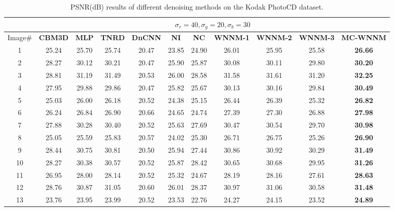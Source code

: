 \begin{table}
\caption{PSNR(dB) results of different denoising methods on the Kodak PhotoCD dataset.}
\begin{adjustwidth}{-1cm}{}
\label{tab4-1}
\begin{center}
\renewcommand\arraystretch{1.0}
\scriptsize
\begin{tabular}{|c||c|c|c|c|c|c|c|c|c|c|}
\hline
&\multicolumn{10}{c|}{ $\sigma_{r} = 40, \sigma_{g} = 20, \sigma_{b} = 30$}
\\
\hline
\hline
Image\#
&
\textbf{CBM3D}
&
\textbf{MLP}
&
\textbf{TNRD}
&
\textbf{DnCNN}
&
\textbf{NI}
&
\textbf{NC}
&
\textbf{WNNM-1}
&
\textbf{WNNM-2}
&
\textbf{WNNM-3}
&
\textbf{MC-WNNM}
\\
\hline
1& 25.24 & 25.70 & 25.74 & 20.47 & 23.85 & 24.90 & 26.01 & 25.95 & 25.58 & \textbf{26.66}
\\
\hline
2& 28.27 & 30.12 & 30.21 & 20.47 & 25.90 & 25.87 & 30.08 & 30.11 & 29.80 & \textbf{30.20} 
\\
\hline
3& 28.81 & 31.19 & 31.49 & 20.53 & 26.00 & 28.58 & 31.58 & 31.61 & 31.20 & \textbf{32.25}  
\\
\hline 
4& 27.95 & 29.88 & 29.86 & 20.47 & 25.82 & 25.67 & 30.13 & 30.16 & 29.84 & \textbf{30.49} 
\\
\hline
5& 25.03 & 26.00 & 26.18 & 20.52 & 24.38 & 25.15 & 26.44 & 26.39 & 25.32 & \textbf{26.82}
\\
\hline
6& 26.24 & 26.84 & 26.90 & 20.66 & 24.65 & 24.74 & 27.39 & 27.30 & 26.88 & \textbf{27.98} 
\\
\hline
7& 27.88 & 30.28 & 30.40 & 20.52 & 25.63 & 27.69 & 30.47 & 30.54 & 29.70 & \textbf{30.98} 
\\
\hline
8& 25.05 & 25.59 & 25.83 & 20.57 & 24.02 & 25.30 & 26.71 & 26.75 & 25.26 & \textbf{26.90}
\\
\hline
9& 28.44 & 30.75 & 30.81 & 20.50 & 25.94 & 27.44 & 30.86 & 30.92 & 30.29 & \textbf{31.49}
\\
\hline
10& 28.27 & 30.38 & 30.57 & 20.52 & 25.87 & 28.42 & 30.65 & 30.68 & 29.95 & \textbf{31.26}
\\
\hline
11& 26.95 & 28.00 & 28.14 & 20.52 & 25.32 & 24.67 & 28.19 & 28.16 & 27.61 & \textbf{28.63}
\\
\hline
12& 28.76 & 30.87 & 31.05 & 20.60 & 26.01 & 28.37 & 30.97 & 31.06 & 30.58 & \textbf{31.48}
\\
\hline
13& 23.76 & 23.95 & 23.99 & 20.52 & 23.53 & 22.76 & 24.27 & 24.15 & 23.52 & \textbf{24.89}
\\

\end{tabular}
\end{center}
\end{adjustwidth}
\end{table}
